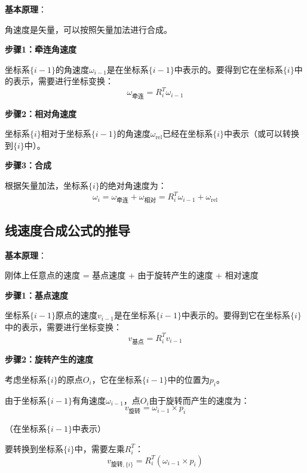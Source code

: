 \documentclass[12pt,a4paper]{article}
\begin{document}
\textbf{基本原理}：

角速度是矢量，可以按照矢量加法进行合成。

\textbf{步骤1：牵连角速度}

坐标系$\{i-1\}$的角速度$\omega_{i-1}$是在坐标系$\{i-1\}$中表示的。要得到它在坐标系$\{i\}$中的表示，需要进行坐标变换：
\begin{equation}
\omega_{\text{牵连}} = R_i^T \omega_{i-1}
\end{equation}

\textbf{步骤2：相对角速度}

坐标系$\{i\}$相对于坐标系$\{i-1\}$的角速度$\omega_{\text{rel}}$已经在坐标系$\{i\}$中表示（或可以转换到$\{i\}$中）。

\textbf{步骤3：合成}

根据矢量加法，坐标系$\{i\}$的绝对角速度为：
\begin{equation}
\omega_i = \omega_{\text{牵连}} + \omega_{\text{相对}} = R_i^T \omega_{i-1} + \omega_{\text{rel}} \tag{3}
\end{equation}

\subsection{线速度合成公式的推导}

\textbf{基本原理}：

刚体上任意点的速度 = 基点速度 + 由于旋转产生的速度 + 相对速度

\textbf{步骤1：基点速度}

坐标系$\{i-1\}$原点的速度$v_{i-1}$是在坐标系$\{i-1\}$中表示的。要得到它在坐标系$\{i\}$中的表示，需要进行坐标变换：
\begin{equation}
v_{\text{基点}} = R_i^T v_{i-1}
\end{equation}

\textbf{步骤2：旋转产生的速度}

考虑坐标系$\{i\}$的原点$O_i$，它在坐标系$\{i-1\}$中的位置为$p_i$。

由于坐标系$\{i-1\}$有角速度$\omega_{i-1}$，点$O_i$由于旋转而产生的速度为：
\begin{equation}
v_{\text{旋转}} = \omega_{i-1} \times p_i
\end{equation}

（在坐标系$\{i-1\}$中表示）

要转换到坐标系$\{i\}$中，需要左乘$R_i^T$：
\begin{equation}
v_{\text{旋转},\{i\}} = R_i^T (\omega_{i-1} \times p_i)
\end{equation}
\end{document}
